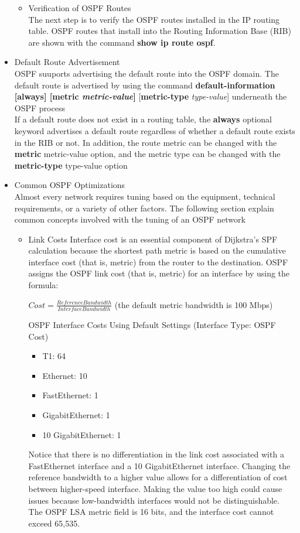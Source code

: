 \documentclass{article}
\begin{document}
\begin{itemize}
\begin{itemize}
			\item Verification of OSPF Routes\\
				The next step is to verify the OSPF routes installed in the IP routing table. OSPF routes that install into the Routing Information Base (RIB) are shown with the command \textbf{show ip route ospf}.
		\end{itemize}

	\item Default Route Advertisement\\
		OSPF suuports advertising the default route into the OSPF domain. The default route is advertised by using the command \textbf{default-information [always] [metric \textit{metric-value}]} [\textbf{metric-type} \textit{type-value}] underneath the OSPF process\\

		If a default route does not exist in a routing table, the \textbf{always} optional keyword advertises a default route regardless of whether a default route exists in the RIB or not. In addition, the route metric can be changed with the \textbf{metric} metric-value option, and the metric type can be changed with the \textbf{metric-type} type-value option\\
	\item Common OSPF Optimizations\\
		Almost every network requires tuning based on the equipment, technical requirements, or a variety of other factors. The following section explain common concepts involved with the tuning of an OSPF network
		\begin{itemize}
			\item Link Costs
				Interface cost is an essential component of Dijkstra's SPF calculation because the shortest path metric is based on the cumulative interface cost (that is, metric) from the router to the destination. OSPF assigns the OSPF link cost (that is, metric) for an interface by using the formula:
				\begin{center}
					$Cost = \frac{Reference Bandwidth}{Interface Bandwidth}$ (the default metric bandwidth is 100 Mbps)
				\end{center}
				OSPF Interface Costs Using Default Settings (Interface Type: OSPF Cost)
				\begin{itemize}
					\item T1: 64
					\item Ethernet: 10
					\item FastEthernet: 1
					\item GigabitEthernet: 1
					\item 10 GigabitEthernet: 1
				\end{itemize}
				Notice that there is no differentiation in the link cost associated with a FastEthernet interface and a 10 GigabitEthernet interface. Changing the reference bandwidth to a higher value allows for a differentiation of cost between higher-speed interface. Making the value too high could cause issues because low-bandwidth interfaces would not be distinguishable. The OSPF LSA metric field is 16 bits, and the interface cost cannot exceed 65,535.\\


\end{itemize}
\end{itemize}
\end{document}
